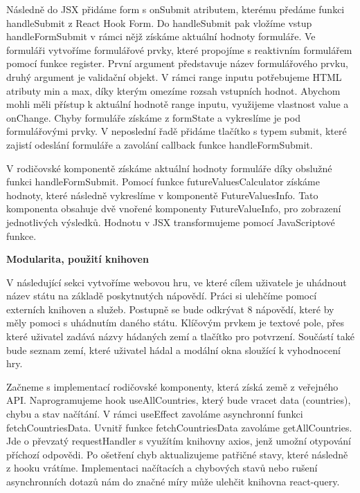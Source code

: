 Následně do JSX přidáme form s onSubmit atributem, kterému předáme funkci handleSubmit z React Hook Form. Do handleSubmit pak vložíme vstup handleFormSubmit v rámci nějž získáme aktuální hodnoty formuláře. 
Ve formuláři vytvoříme formulářové prvky, které propojíme s reaktivním formulářem pomocí funkce register. První argument představuje název formulářového prvku, druhý argument je validační objekt. 
V rámci range inputu potřebujeme HTML atributy min a max, díky kterým omezíme rozsah vstupních hodnot. Abychom mohli měli přístup k aktuální hodnotě range inputu, využijeme vlastnost value a onChange. 
Chyby formuláře získáme z formState a vykreslíme je pod formulářovými prvky. V neposlední řadě přidáme tlačítko s typem submit, které zajistí odeslání formuláře a zavolání callback funkce handleFormSubmit.

V rodičovské komponentě získáme aktuální hodnoty formuláře díky obslužné funkci handleFormSubmit. Pomocí funkce futureValuesCalculator získáme hodnoty, které následně vykreslíme v komponentě FutureValuesInfo. 
Tato komponenta obsahuje dvě vnořené komponenty FutureValueInfo, pro zobrazení jednotlivých výsledků. Hodnotu v JSX transformujeme pomocí JavaScriptové funkce.

\begin{flushleft}
  \textbf{Modularita, použití knihoven}
\end{flushleft}

V následující sekci vytvoříme webovou hru, ve které cílem uživatele je uhádnout název státu na základě poskytnutých nápovědí. Práci si ulehčíme pomocí externích knihoven a služeb.
Postupně se bude odkrývat 8 nápovědí, které by měly pomoci s uhádnutím daného státu. Klíčovým prvkem je textové pole, přes které uživatel zadává názvy hádaných zemí a tlačítko pro potvrzení. 
Součástí také bude seznam zemí, které uživatel hádal a modální okna sloužící k vyhodnocení hry.

Začneme s implementací rodičovské komponenty, která získá země z veřejného API. Naprogramujeme hook useAllCountries, který bude vracet data (countries), chybu a stav načítání. 
V rámci useEffect zavoláme asynchronní funkci fetchCountriesData. Uvnitř funkce fetchCountriesData zavoláme getAllCountries. 
Jde o převzatý requestHandler s využítím knihovny axios, jenž umožní otypování příchozí odpovědi. Po ošetření chyb aktualizujeme patřičné stavy, které následně z hooku vrátíme. 
Implementaci načítacích a chybových stavů nebo rušení asynchronních dotazů nám do značné míry může ulehčit knihovna react-query.

